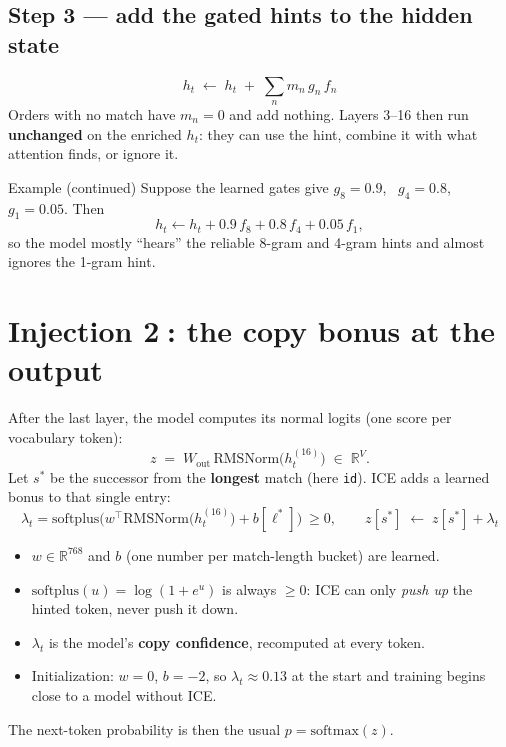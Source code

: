 \documentclass[11pt]{article}
\newcommand{\R}{\mathbb{R}}
\newcommand{\norm}{\mathrm{RMSNorm}}
\begin{document}
\subsection*{Step 3 --- add the gated hints to the hidden state}
\[
\boxed{\, h_t \;\leftarrow\; h_t \;+\; \sum_{n} m_n \, g_n \, f_n \,}
\]
Orders with no match have $m_n = 0$ and add nothing. Layers 3--16 then run \textbf{unchanged} on the enriched $h_t$: they can use the hint, combine it with what attention finds, or ignore it.

\begin{example}{Example (continued)}
Suppose the learned gates give $g_8 = 0.9$, \ $g_4 = 0.8$, \ $g_1 = 0.05$. Then
\[
h_t \leftarrow h_t + 0.9\, f_8 + 0.8\, f_4 + 0.05\, f_1 ,
\]
so the model mostly ``hears'' the reliable 8-gram and 4-gram hints and almost ignores the 1-gram hint.
\end{example}

\section{Injection \textcircled{2}: the copy bonus at the output}

After the last layer, the model computes its normal logits (one score per vocabulary token):
\[
z \;=\; W_{\text{out}}\, \norm\big(h_t^{(16)}\big) \;\in\; \R^{V}.
\]
Let $s^*$ be the successor from the \textbf{longest} match (here \texttt{id}). ICE adds a learned bonus to that single entry:
\[
\boxed{\, \lambda_t = \mathrm{softplus}\!\Big( w^\top \norm\big(h_t^{(16)}\big) + b[\ell^*] \Big) \ \ge 0, \qquad z[s^*] \;\leftarrow\; z[s^*] + \lambda_t \,}
\]
\begin{itemize}
  \item $w \in \R^{768}$ and $b$ (one number per match-length bucket) are learned.
  \item $\mathrm{softplus}(u) = \log(1+e^u)$ is always $\ge 0$: ICE can only \emph{push up} the hinted token, never push it down.
  \item $\lambda_t$ is the model's \textbf{copy confidence}, recomputed at every token.
  \item Initialization: $w = 0$, $b = -2$, so $\lambda_t \approx 0.13$ at the start and training begins close to a model without ICE.
\end{itemize}
The next-token probability is then the usual $p = \mathrm{softmax}(z)$.
\end{document}
